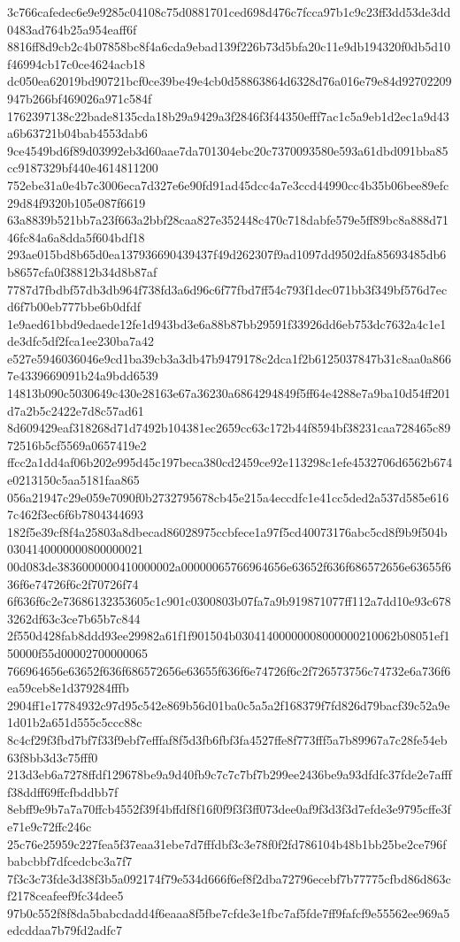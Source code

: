 {3c766cafedec6e9e9285c04108c75d0881701ced698d476c7fcca97b1c9c23ff3dd53de3dd0483ad764b25a954eaff6f
8816ff8d9cb2c4b07858bc8f4a6cda9ebad139f226b73d5bfa20c11e9db194320f0db5d10f46994cb17c0ce4624acb18
dc050ea62019bd90721bcf0ce39be49e4cb0d58863864d6328d76a016e79e84d92702209947b266bf469026a971c584f
1762397138c22bade8135cda18b29a9429a3f2846f3f44350efff7ac1c5a9eb1d2ec1a9d43a6b63721b04bab4553dab6
9ce4549bd6f89d03992eb3d60aae7da701304ebc20c7370093580e593a61dbd091bba85cc9187329bf440e4614811200
752ebe31a0e4b7c3006eca7d327e6e90fd91ad45dcc4a7e3ccd44990cc4b35b06bee89efc29d84f9320b105e087f6619
63a8839b521bb7a23f663a2bbf28caa827e352448c470c718dabfe579e5ff89bc8a888d7146fc84a6a8dda5f604bdf18
293ae015bd8b65d0ea137936690439437f49d262307f9ad1097dd9502dfa85693485db6b8657cfa0f38812b34d8b87af
7787d7fbdbf57db3db964f738fd3a6d96c6f77fbd7ff54c793f1dec071bb3f349bf576d7ecd6f7b00eb777bbe6b0dfdf
1e9aed61bbd9edaede12fe1d943bd3e6a88b87bb29591f33926dd6eb753dc7632a4c1e1de3dfc5df2fca1ee230ba7a42
e527e5946036046e9cd1ba39cb3a3db47b9479178c2dca1f2b6125037847b31c8aa0a8667e4339669091b24a9bdd6539
14813b090c5030649c430e28163e67a36230a6864294849f5ff64e4288e7a9ba10d54ff201d7a2b5c2422e7d8c57ad61
8d609429eaf318268d71d7492b104381ec2659cc63c172b44f8594bf38231caa728465c8972516b5cf5569a0657419e2
ffcc2a1dd4af06b202e995d45c197beca380cd2459ce92e113298c1efe4532706d6562b674e0213150c5aa5181faa865
056a21947c29e059e7090f0b2732795678cb45e215a4eccdfc1e41cc5ded2a537d585e6167c462f3ec6f6b7804344693
182f5e39cf8f4a25803a8dbecad86028975ccbfece1a97f5cd40073176abc5cd8f9b9f504b0304140000000800000021
00d083de3836000000410000002a00000065766964656e63652f636f686572656e63655f636f6e74726f6c2f70726f74
6f636f6c2e73686132353605c1c901c0300803b07fa7a9b919871077ff112a7dd10e93c6783262df63c3ce7b65b7c844
2f550d428fab8ddd93ee29982a61f1f901504b03041400000008000000210062b08051ef150000f55d00002700000065
766964656e63652f636f686572656e63655f636f6e74726f6c2f726573756c74732e6a736f6ea59ceb8e1d379284fffb
2904ff1e17784932c97d95c542e869b56d01ba0c5a5a2f168379f7fd826d79bacf39c52a9e1d01b2a651d555c5ccc88c
8c4cf29f3fbd7bf7f33f9ebf7efffaf8f5d3fb6fbf3fa4527ffe8f773fff5a7b89967a7c28fe54eb63f8bb3d3c75fff0
213d3eb6a7278ffdf129678be9a9d40fb9c7c7c7bf7b299ee2436be9a93dfdfc37fde2e7affff38ddff69ffcfbddbb7f
8ebff9e9b7a7a70ffcb4552f39f4bffdf8f16f0f9f3f3ff073dee0af9f3d3f3d7efde3e9795cffe3fe71e9c72ffc246c
25c76e25959c227fea5f37eaa31ebe7d7fffdbf3c3e78f0f2fd786104b48b1bb25be2ce796fbabcbbf7dfcedcbc3a7f7
7f3c3c73fde3d38f3b5a092174f79e534d666f6ef8f2dba72796ecebf7b77775cfbd86d863cf2178ceafeef9fc34dee5
97b0c552f8f8da5babcdadd4f6eaaa8f5fbe7cfde3e1fbc7af5fde7ff9fafcf9e55562ee969a5edcddaa7b79fd2adfc7
}
